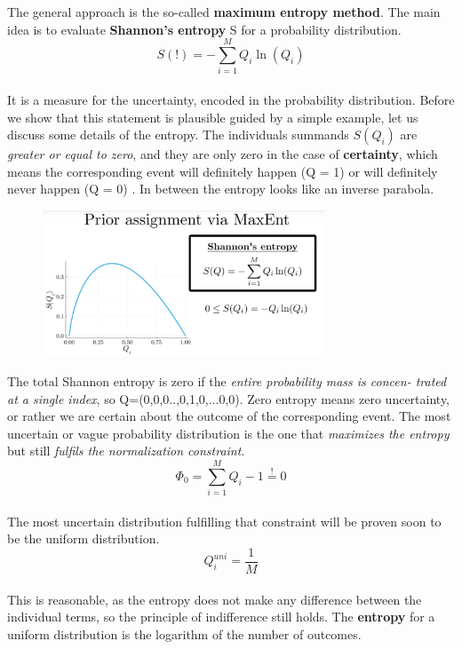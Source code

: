 \documentclass[12pt, a4paper]{scrartcl}
\begin{document}
The general approach is the so-called \textbf{maximum entropy method}. The main
idea is to evaluate \textbf{Shannon’s entropy} S for a probability distribution.%
\begin{equation*}\boxed{S(!)=-\sum_{i=1}^MQ_i\ln(Q_i)
}\end{equation*}\\
It is a measure for the uncertainty, encoded in the probability distribution.
Before we show that this statement is plausible guided by a simple example,
let us discuss some details of the entropy.
The individuals summands $S(Q_i)$ are \textit{greater or equal to zero},
and they are only zero in the case of \textbf{certainty}, which means the corresponding event
will deﬁnitely happen (Q = 1) or will deﬁnitely never happen
(Q = 0) .
In between the entropy looks like an inverse parabola.\\%
 \begin{figure}[H]
	\centering
	\includegraphics[width=0.75\textwidth]{6_3.png}
\end{figure}

The total Shannon entropy is zero if the \textit{entire probability mass is concen-
trated at a single index}, so Q=(0,0,0..,0,1,0,...0,0).
Zero entropy means zero uncertainty, or rather we are certain about the
outcome of the corresponding event. The most uncertain or vague probability
distribution is the one that \textit{maximizes the entropy} but still \textit{fulﬁls the
normalization constraint}.
\begin{equation*}\boxed{\Phi_0=\sum_{i=1}^MQ_i-1\stackrel{!}{=}0
}\end{equation*}\\
The most uncertain distribution fulﬁlling that constraint will be proven soon
to be the uniform distribution.\\
\begin{equation*}\boxed{Q_i^{uni}=\frac 1M
}\end{equation*}\\
This is reasonable, as
the entropy does not make any diﬀerence between the individual terms, so the principle of indiﬀerence still holds.
The \textbf{entropy} for a uniform distribution is the logarithm of the number of
outcomes.\\
\end{document}
